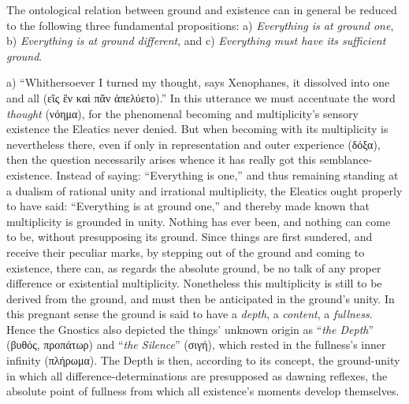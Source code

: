 \documentclass[12pt]{book}
\begin{document}
The ontological relation between ground and existence can in general be
reduced to the following three fundamental propositions: a) \emph{Everything
is at ground one}, b) \emph{Everything is at ground different}, and c)
\emph{Everything must have its sufficient ground}.

a) ``Whithersoever I turned my thought, says Xenophanes, it dissolved into
one and all (εἲς ἓν καὶ πᾶν ἀπελύετο).'' In this utterance we must
accentuate the word \emph{thought} (νόημα), for the phenomenal becoming and
multiplicity's sensory existence the Eleatics never denied. But when
becoming with its multiplicity is nevertheless there, even if only in
representation and outer experience (δόξα), then the question necessarily
arises whence it has really got this semblance-existence. Instead of saying:
``Everything is one,'' and thus remaining standing at a dualism of rational
unity and irrational multiplicity, the Eleatics ought properly to have said:
``Everything is at ground one,'' and thereby made known that multiplicity is
grounded in unity. Nothing has ever been, and nothing can come to be,
without presupposing its ground. Since things are first sundered, and
receive their peculiar marks, by stepping out of the ground and coming to
existence, there can, as regards the absolute ground, be no talk of any
proper difference or existential multiplicity. Nonetheless this multiplicity
is still to be derived from the ground, and must then be anticipated in the
ground's unity. In this pregnant sense the ground is said to have a
\emph{depth}, a \emph{content}, a \emph{fullness}. Hence the Gnostics also
depicted the things' unknown origin as ``\emph{the Depth}'' (βυθός,
προπάτωρ) and ``\emph{the Silence}'' (σιγή), which rested in the fullness's
inner infinity (πλήρωμα). The Depth is then, according to its concept, the
ground-unity in which all difference-determinations are presupposed as
dawning reflexes, the absolute point of fullness from which all existence's
moments develop themselves.
\end{document}
